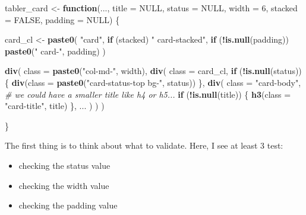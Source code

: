 \documentclass[
]{book}
\newenvironment{Shaded}{\begin{snugshade}}{\end{snugshade}}
\newcommand{\CommentTok}[1]{\textcolor[rgb]{0.56,0.35,0.01}{\textit{#1}}}
\newcommand{\ControlFlowTok}[1]{\textcolor[rgb]{0.13,0.29,0.53}{\textbf{#1}}}
\newcommand{\DataTypeTok}[1]{\textcolor[rgb]{0.13,0.29,0.53}{#1}}
\newcommand{\DecValTok}[1]{\textcolor[rgb]{0.00,0.00,0.81}{#1}}
\newcommand{\KeywordTok}[1]{\textcolor[rgb]{0.13,0.29,0.53}{\textbf{#1}}}
\newcommand{\NormalTok}[1]{#1}
\newcommand{\OperatorTok}[1]{\textcolor[rgb]{0.81,0.36,0.00}{\textbf{#1}}}
\newcommand{\OtherTok}[1]{\textcolor[rgb]{0.56,0.35,0.01}{#1}}
\newcommand{\StringTok}[1]{\textcolor[rgb]{0.31,0.60,0.02}{#1}}
\providecommand{\tightlist}{%
  \setlength{\itemsep}{0pt}\setlength{\parskip}{0pt}}
\begin{document}
\begin{Shaded}
\begin{Highlighting}[]
\NormalTok{tabler_card <-}\StringTok{ }\ControlFlowTok{function}\NormalTok{(..., }\DataTypeTok{title =} \OtherTok{NULL}\NormalTok{, }\DataTypeTok{status =} \OtherTok{NULL}\NormalTok{, }\DataTypeTok{width =} \DecValTok{6}\NormalTok{, }\DataTypeTok{stacked =} \OtherTok{FALSE}\NormalTok{, }\DataTypeTok{padding =} \OtherTok{NULL}\NormalTok{) \{}
  
\NormalTok{  card_cl <-}\StringTok{ }\KeywordTok{paste0}\NormalTok{(}
    \StringTok{"card"}\NormalTok{, }
    \ControlFlowTok{if}\NormalTok{ (stacked) }\StringTok{" card-stacked"}\NormalTok{,}
    \ControlFlowTok{if}\NormalTok{ (}\OperatorTok{!}\KeywordTok{is.null}\NormalTok{(padding)) }\KeywordTok{paste0}\NormalTok{(}\StringTok{" card-"}\NormalTok{, padding)}
\NormalTok{  )}
  
  \KeywordTok{div}\NormalTok{(}
    \DataTypeTok{class =} \KeywordTok{paste0}\NormalTok{(}\StringTok{"col-md-"}\NormalTok{, width),}
    \KeywordTok{div}\NormalTok{(}
      \DataTypeTok{class =}\NormalTok{ card_cl,}
      \ControlFlowTok{if}\NormalTok{ (}\OperatorTok{!}\KeywordTok{is.null}\NormalTok{(status)) \{}
        \KeywordTok{div}\NormalTok{(}\DataTypeTok{class =} \KeywordTok{paste0}\NormalTok{(}\StringTok{"card-status-top bg-"}\NormalTok{, status))}
\NormalTok{      \},}
      \KeywordTok{div}\NormalTok{(}
        \DataTypeTok{class =} \StringTok{"card-body"}\NormalTok{,}
        \CommentTok{# we could have a smaller title like h4 or h5...}
        \ControlFlowTok{if}\NormalTok{ (}\OperatorTok{!}\KeywordTok{is.null}\NormalTok{(title)) \{}
          \KeywordTok{h3}\NormalTok{(}\DataTypeTok{class =} \StringTok{"card-title"}\NormalTok{, title)}
\NormalTok{        \},}
\NormalTok{        ...}
\NormalTok{      )}
\NormalTok{    )}
\NormalTok{  )}
  
\NormalTok{\}}
\end{Highlighting}
\end{Shaded}

The first thing is to think about what to validate. Here, I see at least 3 test:

\begin{itemize}
\tightlist
\item
  checking the status value
\item
  checking the width value
\item
  checking the padding value
\end{itemize}
\end{document}
